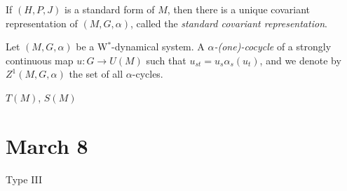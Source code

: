 \documentclass{../../small}
\begin{document}
If $(H,P,J)$ is a standard form of $M$, then there is a unique covariant representation of $(M,G,\alpha)$, called the \emph{standard covariant representation}.

Let $(M,G,\alpha)$ be a W$^*$-dynamical system.
A \emph{$\alpha$-(one)-cocycle} of a strongly continuous map $u:G\to U(M)$ such that $u_{st}=u_s\alpha_s(u_t)$, and we denote by $Z^1(M,G,\alpha)$ the set of all $\alpha$-cycles.




$T(M)$, $S(M)$

\newpage
\section{March 8}

Type III
\end{document}

